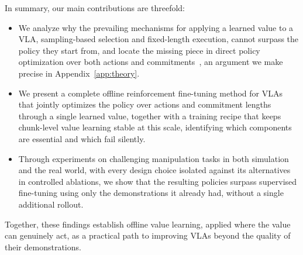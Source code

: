 In summary, our main contributions are threefold:
\begin{itemize}
    \item We analyze why the prevailing mechanisms for applying a learned value to a VLA,
    sampling-based selection and fixed-length execution, cannot surpass the policy they start from,
    and locate the missing piece in direct policy optimization over both actions and
    commitments~\citep{emaq, dqc, park2024bottleneck}, an argument we make precise in
    Appendix~\ref{app:theory}.
    \item We present a complete offline reinforcement fine-tuning method for VLAs that jointly
    optimizes the policy over actions and commitment lengths through a single learned value,
    together with a training recipe that keeps chunk-level value learning stable at this scale,
    identifying which components are essential and which fail silently.
    \item Through experiments on challenging manipulation tasks in both simulation~\citep{robocasa}
    and the real world, with every design choice isolated against its alternatives in controlled
    ablations, we show that the resulting policies surpass supervised fine-tuning using only the
    demonstrations it already had, without a single additional rollout.
\end{itemize}
Together, these findings establish offline value learning, applied where the value can genuinely act,
as a practical path to improving VLAs beyond the quality of their demonstrations.
